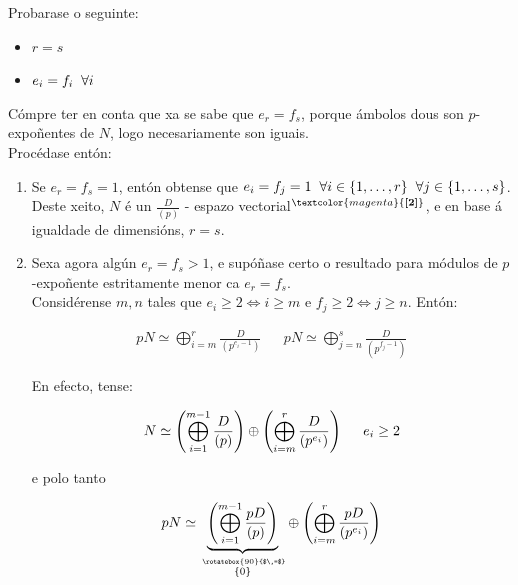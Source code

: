 \documentclass[twoside]{report}
\newcommand{\magbf}[1]{\textcolor{magenta}{\textbf{#1}}} %
\newcommand{\verteq}{\rotatebox{90}{$\,=$}}
\newcommand{\equalto}[2]{\underset{\scriptstyle\overset{\mkern4mu\verteq}{#2}}{#1}}
\theoremstyle{mystyle}
\begin{document}
\noindent Probarase o seguinte: 

\begin{itemize}
    \item $r = s$
    \item $e_{i} = f_{i} \hspace{2mm} \forall i$
\end{itemize}

\noindent Cómpre ter en conta que xa se sabe que $e_{r} = f_{s}$, porque ámbolos dous son $p$-expoñentes de $N$, logo necesariamente son iguais.\\

\noindent Procédase entón:

\begin{enumerate}
    \item  Se $e_{r} = f_{s} = 1$, entón obtense que $e_{i} = f_{j} = 1 \hspace{2mm} \forall i \in \{1, \dots, r\} \hspace{2mm} \forall j \in \{1, \dots, s\}$. Deste xeito, $N$ é un $\displaystyle \frac{D}{(p)}$ - espazo vectorial$^{\magbf{[2]}}$, e en base á igualdade de dimensións, $r = s$.\\
    
    \item Sexa agora algún $e_{r} = f_{s} > 1$, e supóñase certo o resultado para módulos de $p$-expoñente estritamente menor ca $e_{r} = f_{s}$.\\
    
    Considérense $m,n$ tales que $e_{i} \geq 2 \Longleftrightarrow i \geq m$ e $f_{j} \geq 2 \Longleftrightarrow j \geq n$. Entón:
    
    \begin{align} \label{ec4.6}
        pN \simeq \displaystyle \bigoplus_{i = m}^{r} \frac{D}{(p^{e_{i} - 1})} & & pN \simeq \bigoplus_{j = n}^{s} \frac{D}{(p^{f_{j} - 1})}
    \end{align}
    
    En efecto, tense:
    
    $$ N \simeq \left ( \displaystyle \bigoplus_{i = 1}^{m-1} \frac{D}{(p)} \right ) \oplus \left ( \bigoplus_{i = m}^{r} \frac{D}{(p^{e_{i}})} \right ) \hspace{5mm} e_{i} \geq 2$$
    
    \vspace{2mm}
    
    e polo tanto
    
    $$pN \simeq \equalto{\underbrace{\left ( \displaystyle \bigoplus_{i = 1}^{m-1} \frac{pD}{(p)}\right )}}{\{0\}} \oplus \left ( \bigoplus_{i = m}^{r} \frac{pD}{(p^{e_{i}})}\right )$$
    

\end{enumerate}
\end{document}
